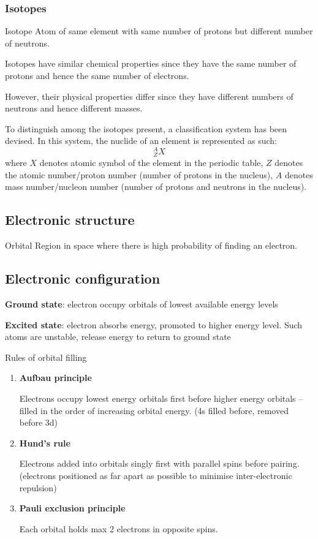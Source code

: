 \subsubsection{Isotopes}

\begin{defn}{Isotope}{}
Atom of same element with same number of protons but different number of neutrons.
\end{defn}

Isotopes have similar chemical properties since they have the same number of protons and hence the same number of electrons. 

However, their physical properties differ since they have different numbers of neutrons and hence different masses.

To distinguish among the isotopes present, a classification system has been devised. In this system, the nuclide of an element is represented as such:
\[ ^A_Z X \]
where $X$ denotes atomic symbol of the element in the periodic table, $Z$ denotes the atomic number/proton number (number of protons in the nucleus), $A$ denotes mass number/nucleon number (number of protons and neutrons in the nucleus).

\subsection{Electronic structure}

\begin{defn}{Orbital}{}
Region in space where there is high probability of finding an electron.
\end{defn}



\subsection{Electronic configuration}
\textbf{Ground state}: electron occupy orbitals of lowest available energy levels

\textbf{Excited state}: electron absorbs energy, promoted to higher energy level. Such atoms are unstable, release energy to return to ground state

Rules of orbital filling
\begin{enumerate}
\item \textbf{Aufbau principle}

Electrons occupy lowest energy orbitals first before higher energy orbitals -- filled in the order of increasing orbital energy.
(4s filled before, removed before 3d)

\item \textbf{Hund's rule}

Electrons added into orbitals singly first with parallel spins before pairing. 
(electrons positioned as far apart as possible to minimise inter-electronic repulsion)

\item \textbf{Pauli exclusion principle}

Each orbital holds max 2 electrons in opposite spins.
\end{enumerate}

